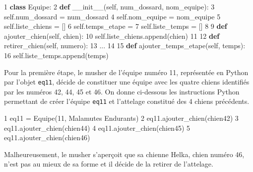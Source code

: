 \documentclass[
  paper=a4,
  ,captions=tableheading
]{scrartcl}
\newenvironment{Shaded}{}{}
\newcommand{\DecValTok}[1]{\textcolor[rgb]{0.25,0.63,0.44}{#1}}
\newcommand{\FunctionTok}[1]{\textcolor[rgb]{0.02,0.16,0.49}{#1}}
\newcommand{\KeywordTok}[1]{\textcolor[rgb]{0.00,0.44,0.13}{\textbf{#1}}}
\newcommand{\NormalTok}[1]{#1}
\newcommand{\OperatorTok}[1]{\textcolor[rgb]{0.40,0.40,0.40}{#1}}
\newcommand{\StringTok}[1]{\textcolor[rgb]{0.25,0.44,0.63}{#1}}
\newcommand{\VariableTok}[1]{\textcolor[rgb]{0.10,0.09,0.49}{#1}}
\begin{document}
\begin{Shaded}
\begin{Highlighting}[]
\DecValTok{1} \KeywordTok{class}\NormalTok{ Equipe:}
\DecValTok{2}   \KeywordTok{def} \FunctionTok{\_\_init\_\_}\NormalTok{(}\VariableTok{self}\NormalTok{, num\_dossard, nom\_equipe):}
\DecValTok{3}       \VariableTok{self}\NormalTok{.num\_dossard }\OperatorTok{=}\NormalTok{ num\_dossard}
\DecValTok{4}       \VariableTok{self}\NormalTok{.nom\_equipe }\OperatorTok{=}\NormalTok{ nom\_equipe}
\DecValTok{5}       \VariableTok{self}\NormalTok{.liste\_chiens }\OperatorTok{=}\NormalTok{ []}
\DecValTok{6}       \VariableTok{self}\NormalTok{.temps\_etape }\OperatorTok{=} \StringTok{\textquotesingle{}\textquotesingle{}}
\DecValTok{7}       \VariableTok{self}\NormalTok{.liste\_temps }\OperatorTok{=}\NormalTok{ []}
\DecValTok{8}
\DecValTok{9}   \KeywordTok{def}\NormalTok{ ajouter\_chien(}\VariableTok{self}\NormalTok{, chien):}
\DecValTok{10}      \VariableTok{self}\NormalTok{.liste\_chiens.append(chien)}
\DecValTok{11}
\DecValTok{12}  \KeywordTok{def}\NormalTok{ retirer\_chien(}\VariableTok{self}\NormalTok{, numero):}
\DecValTok{13}\NormalTok{      ...}
\DecValTok{14}
\DecValTok{15}  \KeywordTok{def}\NormalTok{ ajouter\_temps\_etape(}\VariableTok{self}\NormalTok{, temps):}
\DecValTok{16}      \VariableTok{self}\NormalTok{.liste\_temps.append(temps)}
\end{Highlighting}
\end{Shaded}

Pour la première étape, le musher de l'équipe numéro 11, représentée en
Python par l'objet \texttt{eq11}, décide de constituer une équipe avec
les quatre chiens identifiés par les numéros 42, 44, 45 et 46. On donne
ci-dessous les instructions Python permettant de créer l'équipe
\texttt{eq11} et l'attelage constitué des 4 chiens précédents.

\begin{Shaded}
\begin{Highlighting}[]
\DecValTok{1}\NormalTok{ eq11 }\OperatorTok{=}\NormalTok{ Equipe(}\DecValTok{11}\NormalTok{, }\StringTok{\textquotesingle{}Malamutes Endurants\textquotesingle{}}\NormalTok{)}
\DecValTok{2}\NormalTok{ eq11.ajouter\_chien(chien42)}
\DecValTok{3}\NormalTok{ eq11.ajouter\_chien(chien44)}
\DecValTok{4}\NormalTok{ eq11.ajouter\_chien(chien45)}
\DecValTok{5}\NormalTok{ eq11.ajouter\_chien(chien46)}
\end{Highlighting}
\end{Shaded}

Malheureusement, le musher s'aperçoit que sa chienne Helka, chien numéro
46, n'est pas au mieux de sa forme et il décide de la retirer de
l'attelage.
\end{document}
